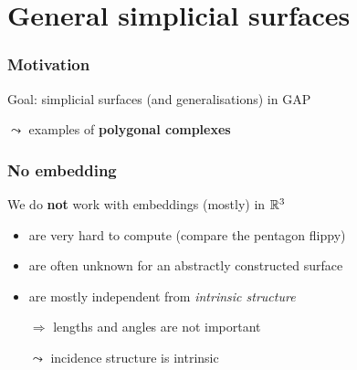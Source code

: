 \section{General simplicial surfaces}
\frame{\tableofcontents[currentsection]}

\begin{frame}
    \frametitle{Motivation}
    \pause
    Goal: simplicial surfaces (and generalisations) in GAP
    \pause
    \begin{center}
        
    \end{center}
    \pause
    $\leadsto$ examples of \textbf{polygonal complexes}
\end{frame}

\begin{frame}
    \frametitle{No embedding}
    \pause
    We do \textbf{not} work with embeddings (mostly) in $\mathbb{R}^3$
    \begin{itemize}
        \pause
        \item are very hard to compute \pause (compare the pentagon flippy)
        \pause
        \item are often unknown for an abstractly constructed surface
        \pause
        \item are mostly independent from \textit{intrinsic structure}
        \pause
        \item[$\Rightarrow$] lengths and angles are not important
        \pause
        \item[$\leadsto$] incidence structure is intrinsic
    \end{itemize}
\end{frame}

